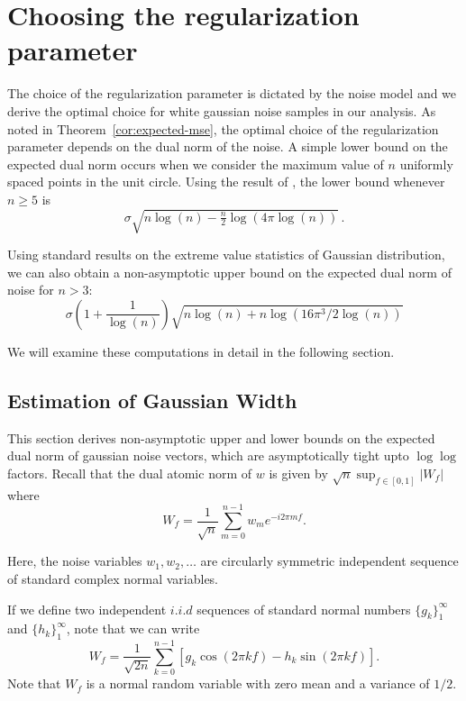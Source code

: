 \section{Choosing the regularization parameter}\label{subsec:parameter}
The choice of the regularization parameter is dictated by the noise model and we
derive the optimal choice for white gaussian noise samples in our analysis. As
noted in Theorem~\ref{cor:expected-mse}, the optimal choice of the
regularization parameter depends on the dual norm of the noise. A simple lower
bound on the expected dual norm occurs when we consider the maximum value of $n$
uniformly spaced points in the unit circle. Using the result of \cite{lr76}, the
lower bound whenever $n \geq 5$ is
\[
\sigma\sqrt{n\log(n) - \tfrac{n}{2} \log(4\pi\log(n))}\,.
\]

Using standard results on the extreme value statistics of Gaussian distribution,
we can also obtain a non-asymptotic upper bound on the expected dual norm of
noise for $n > 3$:
\[\sigma\left(1  + \frac{1}{\log(n)}\right)\sqrt{n\log(n) + n\log(16 \pi^3/2 \log(n))}\nonumber
\]

We will examine these computations in detail in the following section.

\subsection{Estimation of Gaussian Width}
\label{proof:dual-norm-bounds}

This section derives non-asymptotic upper and lower bounds on the expected dual norm of gaussian noise vectors, which are asymptotically tight upto $\log\log$ factors. Recall that the dual atomic norm of $w$ is given by $\sqrt{n}\sup_{f \in [0,1]}|W_f|$ where
\begin{equation*}
\label{ranproc}
W_f = \frac{1}{\sqrt{n}}\sum_{m=0}^{n-1}{w_m e^{-i2 \pi m f}}.
\end{equation*}

Here, the noise variables $w_1, w_2, \ldots$ are circularly symmetric
independent sequence of standard complex normal variables.

If we define two independent $i.i.d$ sequences of standard normal numbers $\{
g_k\}_1^\infty$ and $\{h_k\}_1^\infty$, note that we can write
\begin{equation}
W_f = \frac{1}{\sqrt{2 n}} \sum_{k=0}^{n-1} \left[ g_k \cos(2 \pi k f) - h_k \sin(2\pi k f) \right].
\end{equation}
Note that $W_f$ is a normal random variable with zero mean and a variance of
$1/2$.

